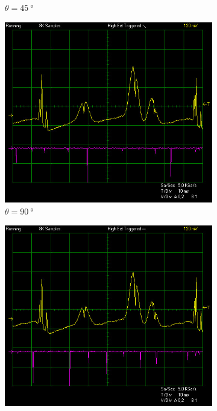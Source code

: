 \documentclass{article}
\begin{document}
\begin{figure}[h]
\begin{subfigure}[b]{0.3\textwidth}
        \caption{$\theta = \SI{45}{\degree}$}
        \label{fig:figure45}
    \end{subfigure}
    \begin{subfigure}[b]{0.3\textwidth}
        \centering
        \includegraphics[width=\linewidth]{Figures/3/90deg.jpg}
        \caption{$\theta = \SI{90}{\degree}$}
        \label{fig:figure90}
    \end{subfigure}
    \begin{subfigure}[b]{0.3\textwidth}
        \centering
        \includegraphics[width=\linewidth]{Figures/3/135deg.jpg}

\end{subfigure}
\end{figure}
\end{document}
